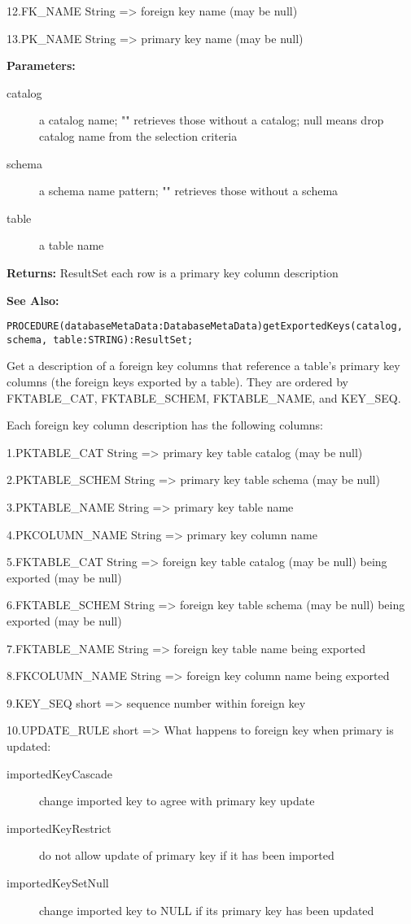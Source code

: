 12.FK\_NAME String => foreign key name (may be null) 

13.PK\_NAME String => primary key name (may be null) 


{\bf Parameters: }
\begin{description}
\item[catalog] a catalog name; "" retrieves those without a catalog; null means drop catalog name from the selection criteria 
\item[schema] a schema name pattern; "" retrieves those without a schema 
\item[table] a table name 
\end{description}

{\bf Returns: } 
ResultSet each row is a primary key column description 

{\bf See Also:} 




\verb'PROCEDURE(databaseMetaData:DatabaseMetaData)getExportedKeys(catalog, schema, table:STRING):ResultSet;'




Get a description of a foreign key columns that reference a table's primary key columns (the foreign keys exported by a table). They are ordered by FKTABLE\_CAT, FKTABLE\_SCHEM, FKTABLE\_NAME, and KEY\_SEQ. 

Each foreign key column description has the following columns: 

1.PKTABLE\_CAT String => primary key table catalog (may be null) 

2.PKTABLE\_SCHEM String => primary key table schema (may be null) 

3.PKTABLE\_NAME String => primary key table name 

4.PKCOLUMN\_NAME String => primary key column name 

5.FKTABLE\_CAT String => foreign key table catalog (may be null) being exported (may be null) 

6.FKTABLE\_SCHEM String => foreign key table schema (may be null) being exported (may be null) 

7.FKTABLE\_NAME String => foreign key table name being exported 

8.FKCOLUMN\_NAME String => foreign key column name being exported 

9.KEY\_SEQ short => sequence number within foreign key 

10.UPDATE\_RULE short => What happens to foreign key when primary is updated: 
\begin{description}
\item[importedKeyCascade] change imported key to agree with primary key update 
\item[importedKeyRestrict] do not allow update of primary key if it has been imported 
\item[importedKeySetNull] change imported key to NULL if its primary key has been updated 
\end{description}


